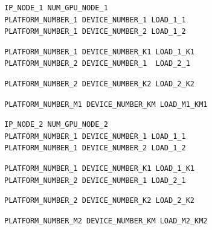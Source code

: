\begin{mdframed}
\begin{mdframed}[hidealllines=true,backgroundcolor=blue!5]
\end{mdframed}
\begin{mdframed}[hidealllines=true,backgroundcolor=red!5]
	\begin{verbatim}
IP_NODE_1 NUM_GPU_NODE_1
PLATFORM_NUMBER_1 DEVICE_NUMBER_1 LOAD_1_1
PLATFORM_NUMBER_1 DEVICE_NUMBER_2 LOAD_1_2
	\end{verbatim}
	\begin{center}
	\scalebox{1.2}{$\hdots$}
	\end{center}
	\begin{verbatim}
PLATFORM_NUMBER_1 DEVICE_NUMBER_K1 LOAD_1_K1
PLATFORM_NUMBER_2 DEVICE_NUMBER_1  LOAD_2_1
	\end{verbatim}
	\begin{center}
	\scalebox{1.2}{$\hdots$}
	\end{center}
	\begin{verbatim}
PLATFORM_NUMBER_2 DEVICE_NUMBER_K2 LOAD_2_K2
	\end{verbatim}
	\begin{center}
	\scalebox{1.2}{$\hdots$}
	\end{center}
	\begin{verbatim}
PLATFORM_NUMBER_M1 DEVICE_NUMBER_KM LOAD_M1_KM1
	\end{verbatim}
\end{mdframed}
\begin{mdframed}[hidealllines=true,backgroundcolor=green!5]
	\begin{verbatim}
IP_NODE_2 NUM_GPU_NODE_2
PLATFORM_NUMBER_1 DEVICE_NUMBER_1 LOAD_1_1
PLATFORM_NUMBER_1 DEVICE_NUMBER_2 LOAD_1_2
	\end{verbatim}
	\begin{center}
	\scalebox{1.2}{$\hdots$}
	\end{center}
	\begin{verbatim}
PLATFORM_NUMBER_1 DEVICE_NUMBER_K1 LOAD_1_K1
PLATFORM_NUMBER_2 DEVICE_NUMBER_1 LOAD_2_1
	\end{verbatim}
	\begin{center}
	\scalebox{1.2}{$\hdots$}
	\end{center}
	\begin{verbatim}
PLATFORM_NUMBER_2 DEVICE_NUMBER_K2 LOAD_2_K2
	\end{verbatim}
	\begin{center}
	\scalebox{1.2}{$\hdots$}
	\end{center}
	\begin{verbatim}
PLATFORM_NUMBER_M2 DEVICE_NUMBER_KM LOAD_M2_KM2
	\end{verbatim}

\end{mdframed}
\end{mdframed}
